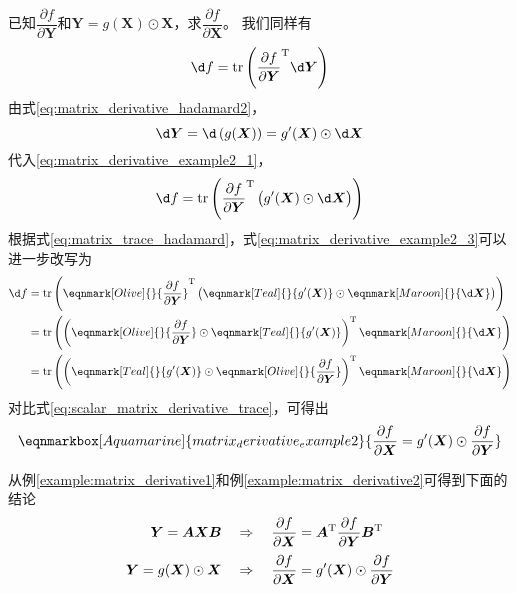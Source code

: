 \begin{example}\label{example:matrix_derivative2}
\colorbox{Aquamarine!30}{已知$\dfrac{\partial f}{\partial \bm{Y}}$和$\bm{Y}=g(\bm{X})\odot\bm{X}$，求$\dfrac{\partial f}{\partial \bm{X}}$}。
我们同样有
\begin{equation}
	\d f = \mathrm{tr}\left({\frac{\partial f}{\partial \bm{Y}}}^{\mathrm{T}}\d \bm{Y}\right)
	\label{eq:matrix_derivative_example2_1}
\end{equation}
由式\eqref{eq:matrix_derivative_hadamard2}，
\begin{equation}
	\d \bm{Y} = \d \left(g(\bm{X})\right) = g'(\bm{X}) \odot \d \bm{X}
	\label{eq:matrix_derivative_example2_2}
\end{equation}
代入\eqref{eq:matrix_derivative_example2_1}，
\begin{equation}
	\d f = \mathrm{tr}\left({\frac{\partial f}{\partial \bm{Y}}}^{\mathrm{T}}\left(\vphantom{A^T}g'(\bm{X}) \odot \d \bm{X}\right)\right)
	\label{eq:matrix_derivative_example2_3}
\end{equation}
根据式\eqref{eq:matrix_trace_hadamard}，式\eqref{eq:matrix_derivative_example2_3}可以进一步改写为
\begin{equation}
	\begin{aligned}
		\d f 
		&= \mathrm{tr}\left(\eqnmark[Olive]{}{\frac{\partial f}{\partial \bm{Y}}}^{\mathrm{T}}\left(\vphantom{A^T}\eqnmark[Teal]{}{g'(\bm{X})} \odot \eqnmark[Maroon]{}{\d \bm{X}}\right)\right) \\
		&= \mathrm{tr}\left(\left({\eqnmark[Olive]{}{\frac{\partial f}{\partial \bm{Y}}}\odot \eqnmark[Teal]{}{g'(\bm{X})}}\right)^{\mathrm{T}}\eqnmark[Maroon]{}{\d \bm{X}}\right) \\
		&= \mathrm{tr}\left(\left({\eqnmark[Teal]{}{g'(\bm{X})} \odot \eqnmark[Olive]{}{\frac{\partial f}{\partial \bm{Y}}}}\right)^{\mathrm{T}}\eqnmark[Maroon]{}{\d \bm{X}}\right)
	\end{aligned}
\end{equation}
对比式\eqref{eq:scalar_matrix_derivative_trace}，可得出
\renewcommand{\eqnhighlightshade}{30}  %
\begin{equation}
	\eqnmarkbox[Aquamarine]{matrix_derivative_example2}{
	\frac{\partial f}{\partial \bm{X}} = g'(\bm{X}) \odot \frac{\partial f}{\partial \bm{Y}}
	}
	\label{eq:matrix_derivative_example2_4}
\end{equation}
\end{example}

从例\ref{example:matrix_derivative1}和例\ref{example:matrix_derivative2}可得到下面的结论
\begin{align}
	\bm{Y}=\bm{A}\bm{X}\bm{B} \quad &\Rightarrow \quad \frac{\partial f}{\partial \bm{X}} = \bm{A}^{\mathrm{T}}\frac{\partial f}{\partial \bm{Y}}\bm{B}^{\mathrm{T}}
	\label{eq:matrix_derivative_conclusion1} \\ %
	\bm{Y}=g(\bm{X})\odot\bm{X} \quad &\Rightarrow \quad \frac{\partial f}{\partial \bm{X}} = g'(\bm{X}) \odot \frac{\partial f}{\partial \bm{Y}} \vphantom{{\frac{\partial f}{\partial \bm{X}}}^{\mathrm{T}}}
	\label{eq:matrix_derivative_conclusion2}  %
\end{align}
